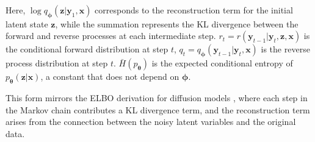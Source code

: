 \documentclass[letterpaper]{article} %
\newcommand{\bx}{\mathbf{x}}
\newcommand{\bz}{\mathbf{z}}
\newcommand{\by}{\mathbf{y}}
\let\oldtheta\theta
\renewcommand{\theta}{{\boldsymbol \oldtheta}}
\let\oldphi\phi
\renewcommand{\phi}{{\boldsymbol \oldphi}}
\begin{document}
Here, \(\log q_\phi(\bz | \by_1, \bx)\) corresponds to the reconstruction term for the initial latent state \(\bz\), while the summation represents the KL divergence between the forward and reverse processes at each intermediate step. \(r_t = r(\by_{t-1} | \by_t, \bz, \bx)\) is the conditional forward distribution at step \(t\), \(q_t = q_\phi(\by_{t-1} | \by_t, \bx)\) is the reverse process distribution at step \(t\). $\bar H(p_\theta)$ is the expected conditional entropy of $p_\theta(\bz|\bx)$, a constant that does not depend on $\phi$.

This form mirrors the ELBO derivation for diffusion models \citep{sohl2015deep}, where each step in the Markov chain contributes a KL divergence term, and the reconstruction term arises from the connection between the noisy latent variables and the original data.






\end{document}
